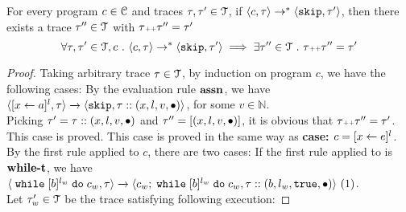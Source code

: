 %
\begin{lem}
\label{lem:tracenondec}
For every program $c \in \mathcal{C}$ and traces $\mathtt{\tau}, \mathtt{\tau}' \in \mathcal{T}$, if 
$\langle c, \mathtt{\tau} \rangle \rightarrow^{*} \langle \mathtt{skip}, \mathtt{\tau}' \rangle$,
then there exists a trace $\mathtt{\tau}'' \in \mathcal{T}$ with $\mathtt{\tau} {\scriptscriptstyle ++} \mathtt{\tau}'' = \mathtt{\tau}'$
%
$$
\forall \mathtt{\tau}, \mathtt{\tau}' \in \mathcal{T}, c ~.~
\langle c, \mathtt{\tau} \rangle \rightarrow^{*} \langle \mathtt{skip}, \mathtt{\tau}' \rangle 
\implies \exists \mathtt{\tau}'' \in \mathcal{T} ~.~ \mathtt{\tau} {\scriptscriptstyle ++} \mathtt{\tau}'' = \mathtt{\tau}'
$$
\end{lem}
\begin{proof}
  Taking arbitrary trace $\mathtt{\tau} \in \mathcal{T}$, by induction on program $c$, we have the following cases:
  By the evaluation rule $\rname{assn}$, we have
  $
  {
  \langle [\mathrel{ {x} \leftarrow a }]^{l},  \mathtt{\tau}  \rangle 
  \xrightarrow{} 
  \langle \mathtt{skip}, \mathtt{\tau} :: ({x}, l, v, \bullet) \rangle
  }$, for some $v \in \mathbb{N}$.
  \\
  Picking $\mathtt{\tau}' = \mathtt{\tau} ::({x}, l, v, \bullet)$ and $\mathtt{\tau}'' =  [({x}, l, v, \bullet) ]$,
  it is obvious that $\mathtt{\tau} {\scriptscriptstyle ++} \mathtt{\tau}'' = \mathtt{\tau}'$.
  \\
  This case is proved.
  This case is proved in the same way as \textbf{case: $c = [\mathrel{ x \leftarrow e }]^l$}.
  By the first rule applied to $c$, there are two cases:
  If the first rule applied to is $\rname{while-t}$, we have
  \\
  $\langle {\;\ensuremath{\mathtt{while}}\;[b]^{l_w} \;\ensuremath{\mathtt{do}}\;c_w, \ensuremath{\mathtt{\tau}}} \rangle
    \xrightarrow{} 
    \langle {
    c_w; \;\ensuremath{\mathtt{while}}\;[b]^{l_w} \;\ensuremath{\mathtt{do}}\;c_w,
    \ensuremath{\mathtt{\tau}}:: (b, l_w, \ensuremath{\mathtt{true}}, \bullet)} \rangle~ (1)
  $.
  \\
  Let $\mathtt{\tau}_w' \in \mathcal{T}$ be the trace satisfying following execution:

\end{proof}
